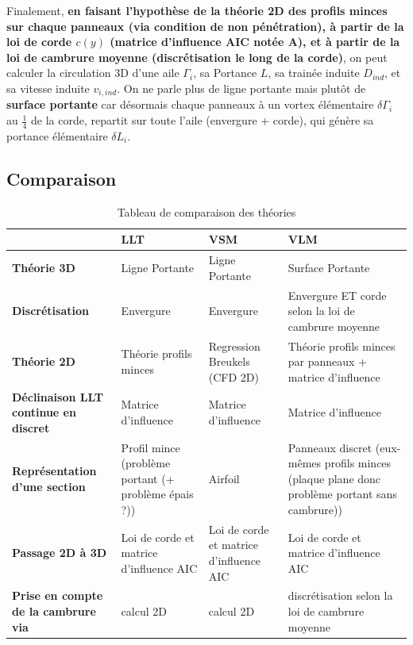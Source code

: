 Finalement, \textbf{en faisant l'hypothèse de la théorie 2D des profils minces sur chaque panneaux (via condition de non pénétration), à partir de la loi de corde $c(y)$ (matrice d'influence AIC notée A), et à partir de la loi de cambrure moyenne (discrétisation le long de la corde)}, on peut calculer la circulation 3D d'une aile $\Gamma_i$, sa Portance $L$, sa trainée induite $D_{ind}$, et sa vitesse induite $v_{i, ind}$. On ne parle plus de ligne portante mais plutôt de \textbf{surface portante} car désormais chaque panneaux à un vortex élémentaire $\delta\Gamma_i$ au $\frac{1}{4}$ de la corde, repartit sur toute l'aile (envergure + corde), qui génère sa portance élémentaire $\delta L_i$.

\subsection{Comparaison} 
\label{subsec:Ch1.2.4}

\begin{table}[h!]
    \centering
    \begin{tabular}{|p{3cm}|p{3cm}|p{4cm}|p{4cm}|}
        \hline
        & \textbf{LLT} & \textbf{VSM} & \textbf{VLM} \\ \hline
        \textbf{Théorie 3D} & Ligne Portante & Ligne Portante & Surface Portante \\ \hline
        \textbf{Discrétisation} & Envergure & Envergure & Envergure ET corde selon la loi de cambrure moyenne \\ \hline
        \textbf{Théorie 2D} & Théorie profils minces & Regression Breukels (CFD 2D) & Théorie profils minces par panneaux + matrice d'influence \\ \hline
        \textbf{Déclinaison LLT continue en discret} & Matrice d'influence & Matrice d'influence & Matrice d'influence \\ \hline
        \textbf{Représentation d'une section} & Profil mince (problème portant (+ problème épais ?)) & Airfoil & Panneaux discret (eux-mêmes profils minces (plaque plane donc problème portant sans cambrure)) \\ \hline
        \textbf{Passage 2D à 3D} & Loi de corde et matrice d'influence AIC & Loi de corde et matrice d'influence AIC & Loi de corde et matrice d'influence AIC \\ \hline
        \textbf{Prise en compte de la cambrure via} & calcul 2D & calcul 2D & discrétisation selon la loi de cambrure moyenne \\ \hline
    \end{tabular}
    \caption{Tableau de comparaison des théories}
    \label{tab:comparaison}
\end{table}